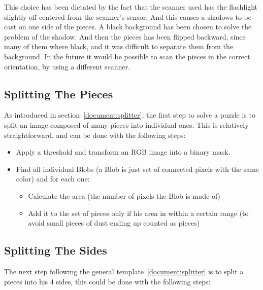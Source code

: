 \documentclass{article}
\begin{document}
This choice has been dictated by the fact that the scanner used has the flashlight
slightly off centered from the scanner's sensor.
And this causes a shadows to be cast on one side of the pieces.
A black background has been chosen to solve the problem of the shadow.
And then the pieces has been flipped backward, since many of them where black,
and it was difficult to separate them from the background.
In the future it would be possible to scan the pieces in the correct orientation,
by using a different scanner.


\subsection{Splitting The Pieces}
As introduced in section~\ref{document:splitter}, the first step to solve a puzzle
is to split an image composed of many pieces into individual ones.
This is relatively straightforward, and can be done with the following steps:

\begin{itemize}
  \item Apply a threshold and transform an RGB image into a binary mask.
  \item Find all individual Blobs
  (a Blob is just set of connected pixels with the same color) and for each one:

  \begin{itemize}
  \item Calculate the area (the number of pixels the Blob is made of)

  \item Add it to the set of pieces only if his area in within a certain range (to avoid small pieces of dust ending up counted as pieces)

  \end{itemize}

\end{itemize}

\subsection{Splitting The Sides}

The next step following the general template~\ref{document:splitter}
is to split a pieces into
his 4 sides, this could be done with the following steps:
\end{document}
